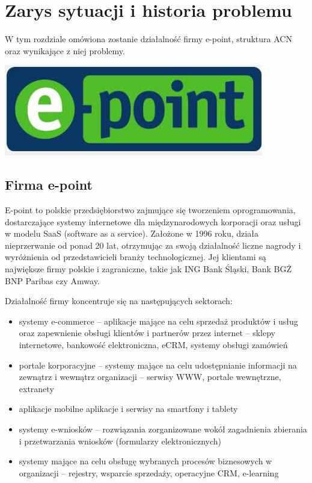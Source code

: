 \documentclass[licencjacka]{pracamgr}
\begin{document}
\chapter{Zarys sytuacji i historia problemu}

W tym rozdziale omówiona zostanie działalność firmy e-point, struktura ACN oraz wynikające z niej problemy.

\begin{center}
\includegraphics[scale=0.52]{images/logo.JPG}
\end{center}

\section{Firma e-point}

E-point to polskie przedsiębiorstwo zajmujące się tworzeniem oprogramowania, dostarczające systemy internetowe dla międzynarodowych korporacji oraz usługi w modelu SaaS (software as a service). Założone w 1996 roku, działa nieprzerwanie od ponad 20 lat, otrzymując za swoją działalność liczne nagrody i wyróżnienia od przedstawicieli branży technologicznej. Jej klientami są największe firmy polskie i zagraniczne, takie jak ING Bank Śląski, Bank BGŻ BNP Paribas czy Amway.

Działalność firmy koncentruje się na następujących sektorach:
\begin{itemize}
\item systemy e-commerce – aplikacje mające na celu sprzedaż produktów i usług oraz zapewnienie obsługi klientów i partnerów przez internet – sklepy internetowe, bankowość elektroniczna, eCRM, systemy obsługi zamówień
\item portale korporacyjne – systemy mające na celu udostępnianie informacji na zewnątrz i wewnątrz organizacji – serwisy WWW, portale wewnętrzne, extranety
\item aplikacje mobilne aplikacje i serwisy na smartfony i tablety
\item systemy e-wniosków – rozwiązania zorganizowane wokół zagadnienia zbierania i przetwarzania wniosków (formularzy elektronicznych)
\item systemy mające na celu obsługę wybranych procesów biznesowych w organizacji – rejestry, wsparcie sprzedaży, operacyjne CRM, e-learning
\end{itemize}
\end{document}
